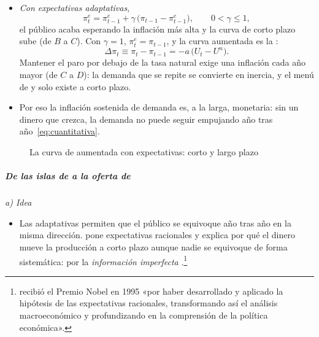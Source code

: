 \documentclass[11pt]{article}
\begin{document}
\begin{itemize}
\item \emph{Con expectativas adaptativas},
  \begin{equation*}
  \pi^e_t=\pi^e_{t-1}+\gamma\,\big(\pi_{t-1}-\pi^e_{t-1}\big),\qquad 0<\gamma\leq1,
  \end{equation*}
  el público acaba esperando la inflación más alta y la curva de corto plazo sube (de $B$ a $C$). Con $\gamma=1$, $\pi^e_t=\pi_{t-1}$, y la curva aumentada es la  :
  \begin{equation}\label{eq:aceleracionista}
  \Delta\pi_t\equiv\pi_t-\pi_{t-1}=-a\,\big(U_t-U^n\big).
  \end{equation}
  Mantener el paro por debajo de la tasa natural exige una inflación cada año mayor (de $C$ a $D$): la demanda que se repite se convierte en inercia, y el menú de  y  solo existe a corto plazo.
\item Por eso la inflación sostenida de demanda es, a la larga, monetaria: sin un dinero que crezca, la demanda no puede seguir empujando año tras año~\eqref{eq:cuantitativa}.
\end{itemize}

\begin{figure}[H]
\centering
\caption{La curva de  aumentada con expectativas: corto y largo plazo}\label{fig:phillips-aumentada}
\end{figure}

\subparagraph{De las islas de  a la oferta de }

\hspace*{4.8em}\emph{a) Idea}

\begin{itemize}
\item Las adaptativas permiten que el público se equivoque año tras año en la misma dirección. \textcite{Lucas1972Expectations} pone expectativas racionales y explica por qué el dinero mueve la producción a corto plazo aunque nadie se equivoque de forma sistemática: por la \emph{información imperfecta} .\footnote{ recibió el Premio Nobel en 1995 «por haber desarrollado y aplicado la hipótesis de las expectativas racionales, transformando así el análisis macroeconómico y profundizando en la comprensión de la política económica»\nocite{Nobel1995Lucas}.}
\end{itemize}
\end{document}

